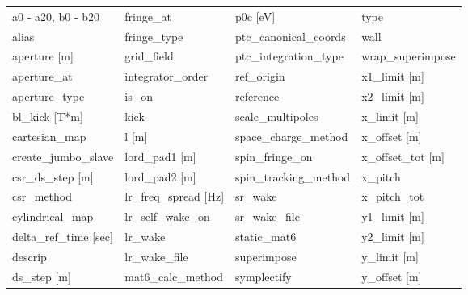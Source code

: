  \begin{tabular}{llll} \toprule
a0 - a20, b0 - b20               & fringe_at                        & p0c [eV]                         & type                             \\
alias                            & fringe_type                      & ptc_canonical_coords             & wall                             \\
aperture [m]                     & grid_field                       & ptc_integration_type             & wrap_superimpose                 \\
aperture_at                      & integrator_order                 & ref_origin                       & x1_limit [m]                     \\
aperture_type                    & is_on                            & reference                        & x2_limit [m]                     \\
bl_kick [T*m]                    & kick                             & scale_multipoles                 & x_limit [m]                      \\
cartesian_map                    & l [m]                            & space_charge_method              & x_offset [m]                     \\
create_jumbo_slave               & lord_pad1 [m]                    & spin_fringe_on                   & x_offset_tot [m]                 \\
csr_ds_step [m]                  & lord_pad2 [m]                    & spin_tracking_method             & x_pitch                          \\
csr_method                       & lr_freq_spread [Hz]              & sr_wake                          & x_pitch_tot                      \\
cylindrical_map                  & lr_self_wake_on                  & sr_wake_file                     & y1_limit [m]                     \\
delta_ref_time [sec]             & lr_wake                          & static_mat6                      & y2_limit [m]                     \\
descrip                          & lr_wake_file                     & superimpose                      & y_limit [m]                      \\
ds_step [m]                      & mat6_calc_method                 & symplectify                      & y_offset [m]                     \\

\end{tabular}
